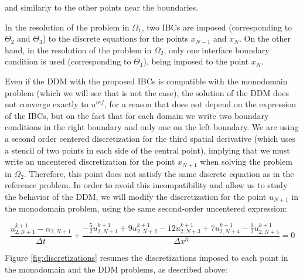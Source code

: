 \noindent and similarly to the other points near the boundaries.

\indent In the resolution of the problem in $\Omega_1$, two IBCs are imposed (corresponding to $\Theta_2$ and $\Theta_3$) to the discrete equations for the points $x_{N-1}$ and $x_N$. On the other hand, in the resolution of the problem in $\Omega_2$, only one interface boundary condition is used (corresponding to $\Theta_1$), being imposed to the point $x_N$.

\begin{remark}Even if the DDM with the proposed IBCs is compatible with the monodomain problem (which we will see that is not the case), the solution of the DDM does not converge exactly to $u^{ref}$, for a reason that does not depend on the expression of the IBCs, but on the fact that for each domain we write two boundary conditions in the right boundary and only one on the left boundary. We are using a second order centered discretization for the third spatial derivative (which uses a stencil of two points in each side of the central point), implying that we must write an uncentered discretization for the point $x_{N+1}$ when solving the problem in $\Omega_2$. Therefore, this point does not satisfy the same discrete equation as in the reference problem. In order to avoid this incompatibility and allow us to study the behavior of the DDM, we will modify the discretization for the point $u_{N+1}$ in the monodomain problem, using the same second-order uncentered expression:\end{remark}

\begin{equation*}
    \frac{u_{2,N+1}^{k+1} - \alpha_{2,N+1}}{\Delta t} + \frac{-\frac{5}{2}u_{2,N+1}^{k+1} + 9u_{2,N+2}^{k+1} - 12 u_{2,N+3}^{k+1} + 7 u_{2,N+4}^{k+1} -\frac{3}{2}u_{2,N+5}^{k+1}}{\Delta x ^3} = 0
\end{equation*}

\indent Figure \ref{fig:discretizations} resumes the discretizations imposed to each point in the monodomain and the DDM problems, as described above:

\indent 

